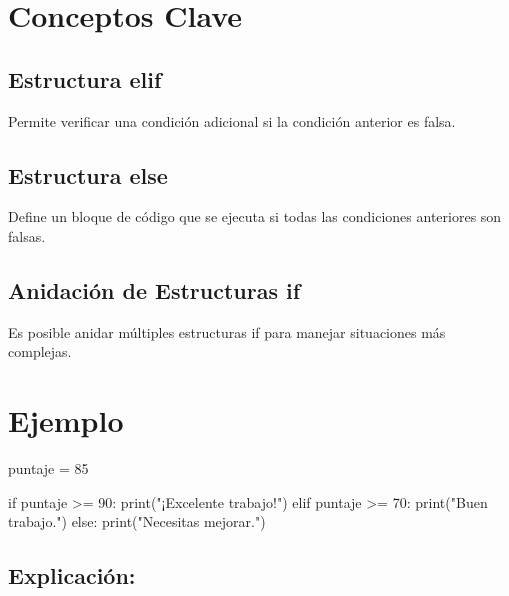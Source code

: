 \documentclass[
  a4paper,
  DIV=11,
  numbers=noendperiod,
  onepage,
  openany]{scrreprt}
\newenvironment{Shaded}{\begin{snugshade}}{\end{snugshade}}
\newcommand{\BuiltInTok}[1]{\textcolor[rgb]{0.00,0.23,0.31}{#1}}
\newcommand{\ControlFlowTok}[1]{\textcolor[rgb]{0.00,0.23,0.31}{#1}}
\newcommand{\DecValTok}[1]{\textcolor[rgb]{0.68,0.00,0.00}{#1}}
\newcommand{\NormalTok}[1]{\textcolor[rgb]{0.00,0.23,0.31}{#1}}
\newcommand{\OperatorTok}[1]{\textcolor[rgb]{0.37,0.37,0.37}{#1}}
\newcommand{\StringTok}[1]{\textcolor[rgb]{0.13,0.47,0.30}{#1}}
\begin{document}
\section{Conceptos Clave}\label{conceptos-clave-13}

\subsection{Estructura elif}\label{estructura-elif}

Permite verificar una condición adicional si la condición anterior es
falsa.

\subsection{Estructura else}\label{estructura-else}

Define un bloque de código que se ejecuta si todas las condiciones
anteriores son falsas.

\subsection{Anidación de Estructuras
if}\label{anidaciuxf3n-de-estructuras-if}

Es posible anidar múltiples estructuras if para manejar situaciones más
complejas.

\section{Ejemplo}\label{ejemplo-8}

\begin{Shaded}
\begin{Highlighting}[]
\NormalTok{puntaje }\OperatorTok{=} \DecValTok{85}

\ControlFlowTok{if}\NormalTok{ puntaje }\OperatorTok{\textgreater{}=} \DecValTok{90}\NormalTok{:}
    \BuiltInTok{print}\NormalTok{(}\StringTok{"¡Excelente trabajo!"}\NormalTok{)}
\ControlFlowTok{elif}\NormalTok{ puntaje }\OperatorTok{\textgreater{}=} \DecValTok{70}\NormalTok{:}
    \BuiltInTok{print}\NormalTok{(}\StringTok{"Buen trabajo."}\NormalTok{)}
\ControlFlowTok{else}\NormalTok{:}
    \BuiltInTok{print}\NormalTok{(}\StringTok{"Necesitas mejorar."}\NormalTok{)}
\end{Highlighting}
\end{Shaded}

\subsection{Explicación:}\label{explicaciuxf3n-18}
\end{document}
